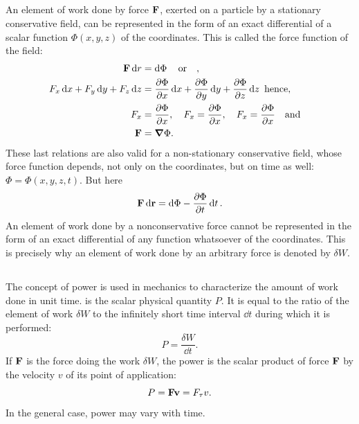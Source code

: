 \subsection{}\label{3.1.8} An element of work done by force $\vb{F}$, exerted on a particle by a stationary conservative field, can be represented in the form of an exact differential of a scalar function $\Phi (x, y, z)$ of the coordinates. This is called the force function of the field:
\begin{align*}%
\vb{F} \dd{r} & = \dd{\Phi} \qor, \\
F_{x}\dd{x} + F_{y}\dd{y}+ F_{z}\dd{z} & = \pdv{\Phi}{x}\dd{x} + \pdv{\Phi}{y}\dd{y} + \pdv{\Phi}{z}\dd{z} \text{ hence},\\
F_{x} &= \pdv{\Phi}{x}, \quad F_{x} = \pdv{\Phi}{x}, \quad F_{x} = \pdv{\Phi}{x} \qand \\
\vb{F} & = \grad \Phi.
\end{align*}
These last relations are also valid for a non-stationary conser­vative field, whose force function depends, not only on the coordinates, but on time as well: $\Phi = \Phi (x, y, z, t)$. But here
\begin{equation*}%
\vb{F} \dd{\vb{r}} = \dd{\Phi} - \pdv{\Phi}{t} \dd{t}.
\end{equation*}
An element of work done by a nonconservative force cannot be represented in the form of an exact differential of any function whatsoever of the coordinates. This is precisely why an element of work done by an arbitrary force is denoted by $\delta W$.

\subsection{}\label{3.1.9} The concept of power is used in mechanics to characterize the amount of work done in unit time.  is the scalar physical quantity $P$. It is equal to the ratio of the element of work $\delta W$ to the infinitely short time interval $\dd{t}$ during which it is performed:
\begin{equation*}%
P = \dfrac{\delta W}{\dd{t}}.
\end{equation*}
If $\vb{F}$ is the force doing the work  $\delta W$, the power is the scalar pro­duct of force $\vb{F}$ by the velocity $v$ of its point of application:
\begin{equation*}%
P = \vb{Fv} = F_{\tau}v.
\end{equation*}
In the general case, power may vary with time.


